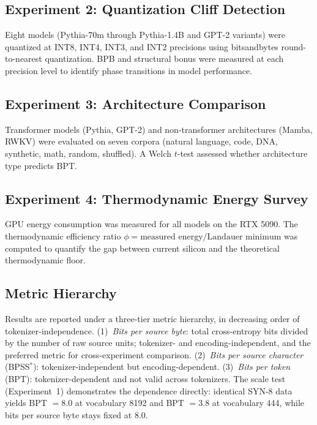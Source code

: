 \documentclass[11pt]{article}
\begin{document}
\subsection{Experiment 2: Quantization Cliff Detection}

Eight models (Pythia-70m through Pythia-1.4B and GPT-2 variants) were quantized at INT8, INT4, INT3, and INT2 precisions using bitsandbytes round-to-nearest quantization. BPB and structural bonus were measured at each precision level to identify phase transitions in model performance.

\subsection{Experiment 3: Architecture Comparison}

Transformer models (Pythia, GPT-2) and non-transformer architectures (Mamba, RWKV) were evaluated on seven corpora (natural language, code, DNA, synthetic, math, random, shuffled). A Welch $t$-test assessed whether architecture type predicts BPT.

\subsection{Experiment 4: Thermodynamic Energy Survey}

GPU energy consumption was measured for all models on the RTX 5090. The thermodynamic efficiency ratio $\phi = \text{measured energy} / \text{Landauer minimum}$ was computed to quantify the gap between current silicon and the theoretical thermodynamic floor.

\subsection{Metric Hierarchy}

Results are reported under a three-tier metric hierarchy, in decreasing order of tokenizer-independence. (1)~\emph{Bits per source byte}: total cross-entropy bits divided by the number of raw source units; tokenizer- and encoding-independent, and the preferred metric for cross-experiment comparison. (2)~\emph{Bits per source character} (BPSS$^*$): tokenizer-independent but encoding-dependent. (3)~\emph{Bits per token} (BPT): tokenizer-dependent and not valid across tokenizers. The scale test (Experiment~1) demonstrates the dependence directly: identical SYN-8 data yields BPT $= 8.0$ at vocabulary 8192 and BPT $= 3.8$ at vocabulary 444, while bits per source byte stays fixed at 8.0.
\end{document}
